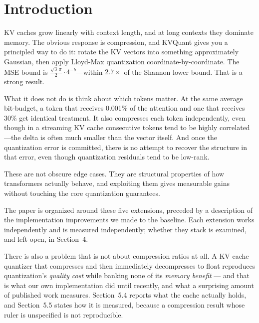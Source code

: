\documentclass[11pt]{article}
\begin{document}
\begin{abstract}
Two caveats stated up front, because both were previously overstated. First,
our measured compression ratios are roughly \textbf{half} the nominal $16/b$
figure, because that figure ignores the per-vector L2 norms the codec must
store; we count them. Second, each extension is measured \textbf{in
isolation}, against its own baseline. An earlier version of this paper claimed
the gains ``compound'' when composed; that claim was never measured, is
contradicted for one pair of stages by our own Section~3.3, and is withdrawn
in Section~4.
\end{abstract}

\section{Introduction}

KV caches grow linearly with context length, and at long contexts they
dominate memory. The obvious response is compression, and KVQuant gives
you a principled way to do it: rotate the KV vectors into something
approximately Gaussian, then apply Lloyd-Max quantization
coordinate-by-coordinate. The MSE bound is
$\frac{\sqrt{3}\,\pi}{2} \cdot 4^{-b}$---within $2.7\times$ of the Shannon
lower bound. That is a strong result.

What it does not do is think about which tokens matter. At the same average
bit-budget, a token that receives 0.001\% of the attention and one that
receives 30\% get identical treatment. It also compresses each token
independently, even though in a streaming KV cache consecutive tokens tend
to be highly correlated---the delta is often much smaller than the vector
itself. And once the quantization error is committed, there is no attempt to
recover the structure in that error, even though quantization residuals tend
to be low-rank.

These are not obscure edge cases. They are structural properties of how
transformers actually behave, and exploiting them gives measurable gains
without touching the core quantization guarantees.

The paper is organized around these five extensions, preceded by a
description of the implementation improvements we made to the baseline. Each
extension works independently and is measured independently; whether they
stack is examined, and left open, in Section~4.

There is also a problem that is not about compression ratios at all. A KV
cache quantizer that compresses and then immediately decompresses to float
reproduces quantization's \emph{quality cost} while banking none of its
\emph{memory benefit} --- and that is what our own implementation did until
recently, and what a surprising amount of published work measures.
Section~5.4 reports what the cache actually holds, and Section~5.5 states how
it is measured, because a compression result whose ruler is unspecified is
not reproducible.
\end{document}
